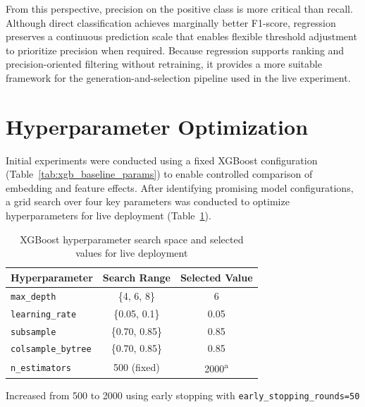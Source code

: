 From this perspective, precision on the positive class is more critical than recall. Although direct classification achieves marginally better F1-score, regression preserves a continuous prediction scale that enables flexible threshold adjustment to prioritize precision when required. Because regression supports ranking and precision-oriented filtering without retraining, it provides a more suitable framework for the generation-and-selection pipeline used in the live experiment.

\section{Hyperparameter Optimization}
\label{sec:hyperparam_optimization}

Initial experiments were conducted using a fixed XGBoost configuration (Table~\ref{tab:xgb_baseline_params}) to enable controlled comparison of embedding and feature effects. After identifying promising model configurations, a grid search over four key parameters was conducted to optimize hyperparameters for live deployment (Table~\ref{tab:hyperparameter_tuning}).

\begin{table}[htbp]
\centering
\caption{XGBoost hyperparameter search space and selected values for live deployment}
\label{tab:hyperparameter_tuning}
\begin{threeparttable}
\begin{tabular}{lcc}
\toprule
\textbf{Hyperparameter} & \textbf{Search Range} & \textbf{Selected Value} \\
\midrule
\texttt{max\_depth} & \{4, 6, 8\} & 6 \\
\texttt{learning\_rate} & \{0.05, 0.1\} & 0.05 \\
\texttt{subsample} & \{0.70, 0.85\} & 0.85 \\
\texttt{colsample\_bytree} & \{0.70, 0.85\} & 0.85 \\
\texttt{n\_estimators} & 500 (fixed) & 2000\textsuperscript{a} \\
\bottomrule
\end{tabular}
\begin{tablenotes}
\small
\item[a] Increased from 500 to 2000 using early stopping with \texttt{early\_stopping\_rounds=50}
\end{tablenotes}
\end{threeparttable}
\end{table}

